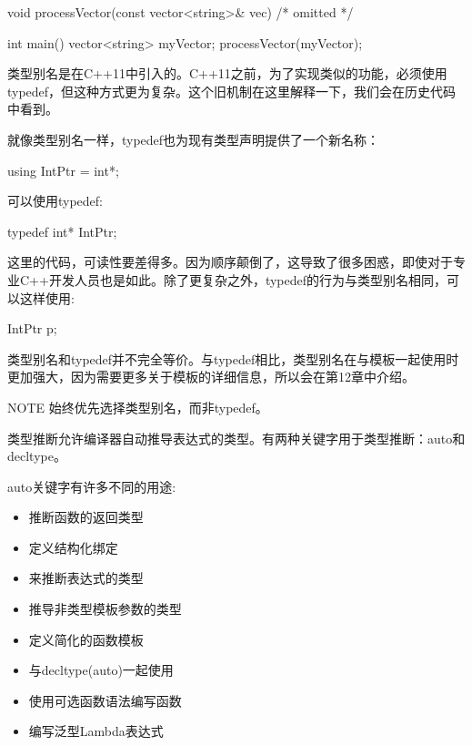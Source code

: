 \begin{cpp}
void processVector(const vector<string>& vec) { /* omitted */ }

int main()
{
    vector<string> myVector;
    processVector(myVector);
}
\end{cpp}


类型别名是在C++11中引入的。C++11之前，为了实现类似的功能，必须使用typedef，但这种方式更为复杂。这个旧机制在这里解释一下，我们会在历史代码中看到。

就像类型别名一样，typedef也为现有类型声明提供了一个新名称：

\begin{cpp}
using IntPtr = int*;
\end{cpp}

可以使用typedef:

\begin{cpp}
typedef int* IntPtr;
\end{cpp}

这里的代码，可读性要差得多。因为顺序颠倒了，这导致了很多困惑，即使对于专业C++开发人员也是如此。除了更复杂之外，typedef的行为与类型别名相同，可以这样使用:

\begin{cpp}
IntPtr p;
\end{cpp}

类型别名和typedef并不完全等价。与typedef相比，类型别名在与模板一起使用时更加强大，因为需要更多关于模板的详细信息，所以会在第12章中介绍。

\begin{myNotic}{NOTE}
始终优先选择类型别名，而非typedef。
\end{myNotic}


类型推断允许编译器自动推导表达式的类型。有两种关键字用于类型推断：auto和decltype。


auto关键字有许多不同的用途:

\begin{itemize}
\item
推断函数的返回类型

\item
定义结构化绑定

\item
来推断表达式的类型

\item
推导非类型模板参数的类型

\item
定义简化的函数模板

\item
与decltype(auto)一起使用

\item
使用可选函数语法编写函数

\item
编写泛型Lambda表达式
\end{itemize}

